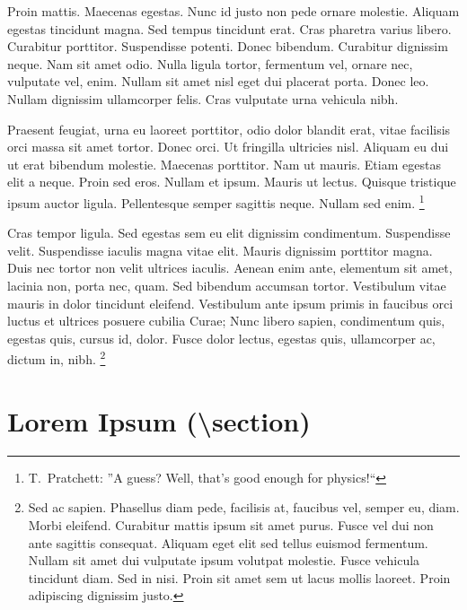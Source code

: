 \documentclass[nochapterpage,bigchapter,linedtoc,longdoc,colorback,accentcolor=tud4c]{tudreport}
\begin{document}
    Proin mattis. Maecenas egestas. Nunc id justo non pede ornare molestie. Aliquam egestas tincidunt magna. Sed tempus tincidunt erat. Cras pharetra varius libero. Curabitur porttitor. Suspendisse potenti. Donec bibendum. Curabitur dignissim neque. Nam sit amet odio. Nulla ligula tortor, fermentum vel, ornare nec, vulputate vel, enim. Nullam sit amet nisl eget dui placerat porta. Donec leo. Nullam dignissim ullamcorper felis. Cras vulputate urna vehicula nibh.
    
    Praesent feugiat, urna eu laoreet porttitor, odio dolor blandit erat, vitae facilisis orci massa sit amet tortor. Donec orci. Ut fringilla ultricies nisl. Aliquam eu dui ut erat bibendum molestie. Maecenas porttitor. Nam ut mauris. Etiam egestas elit a neque. Proin sed eros. Nullam et ipsum. Mauris ut lectus. Quisque tristique ipsum auctor ligula. Pellentesque semper sagittis neque. Nullam sed enim.%
    \footnote{T.\ Pratchett: ''A guess? Well, that's good enough for physics!{``}}

    Cras tempor ligula. Sed egestas sem eu elit dignissim condimentum. Suspendisse velit. Suspendisse iaculis magna vitae elit. Mauris dignissim porttitor magna. Duis nec tortor non velit ultrices iaculis. Aenean enim ante, elementum sit amet, lacinia non, porta nec, quam. Sed bibendum accumsan tortor. Vestibulum vitae mauris in dolor tincidunt eleifend. Vestibulum ante ipsum primis in faucibus orci luctus et ultrices posuere cubilia Curae; Nunc libero sapien, condimentum quis, egestas quis, cursus id, dolor. Fusce dolor lectus, egestas quis, ullamcorper ac, dictum in, nibh.%
    \footnote{Sed ac sapien. Phasellus diam pede, facilisis at, faucibus vel, semper eu, diam. Morbi eleifend. Curabitur mattis ipsum sit amet purus. Fusce vel dui non ante sagittis consequat. Aliquam eget elit sed tellus euismod fermentum. Nullam sit amet dui vulputate ipsum volutpat molestie. Fusce vehicula tincidunt diam. Sed in nisi. Proin sit amet sem ut lacus mollis laoreet. Proin adipiscing dignissim justo.}

  \section{Lorem Ipsum (\textbackslash section)}
\end{document}
